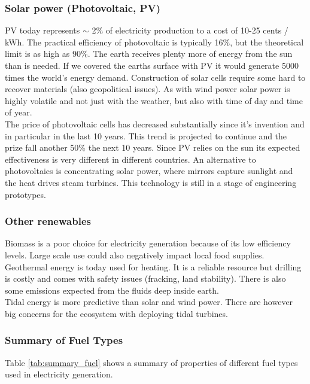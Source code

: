 \subsubsection{Solar power (Photovoltaic, PV)}
PV today represents $\sim$ 2\% of electricity production to a cost of 10-25 cents / kWh.
The practical efficiency of photovoltaic is typically 16\%, but the theoretical limit is as high as 90\%.
The earth receives plenty more of energy from the sun than is needed. If we covered the earths surface with PV it would generate 5000 times the world's energy demand.
Construction of solar cells require some hard to recover materials (also geopolitical issues).
As with wind power solar power is highly volatile and not just with the weather, but also with time of day and time of year.\\

The price of photovoltaic cells has decreased substantially since it's invention and in particular in the last 10 years. This trend is projected to continue and the prize fall another 50\% the next 10 years.
Since PV relies on the sun its expected effectiveness is very different in different countries.
An alternative to photovoltaics is concentrating solar power, where mirrors capture sunlight and the heat drives steam turbines. This technology is still in a stage of engineering prototypes.

\subsubsection{Other renewables}
Biomass is a poor choice for electricity generation because of its low efficiency levels. Large scale use could also negatively impact local food supplies.\\

Geothermal energy is today used for heating.
It is a reliable resource but drilling is costly and comes with safety issues (fracking, land stability).
There is also some \cotwo emissions expected from the fluids deep inside earth.\\

Tidal energy is more predictive than solar and wind power. There are however big concerns for the ecosystem with deploying tidal turbines.

\subsubsection{Summary of Fuel Types}
Table \ref{tab:summary_fuel} shows a summary of properties of different fuel types used in electricity generation.

